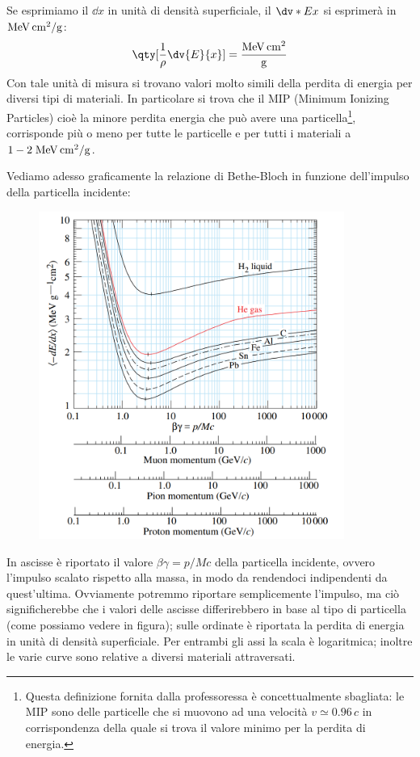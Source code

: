 Se esprimiamo il $\dd{x}$ in unità di densità superficiale, il $\dv*{E}{x}$ si esprimerà in $\rm MeV \, cm^2/g$:
\begin{equation*}
    \qty[ \frac{1}{\rho} \dv{E}{x} ]=\rm \frac{MeV \, cm^2}{g}
\end{equation*}
Con tale unità di misura si trovano valori molto simili della perdita di energia per diversi tipi di materiali. In particolare si trova che il MIP (Minimum Ionizing Particles) cioè la minore perdita energia che può avere una particella\footnote{Questa definizione fornita dalla professoressa è concettualmente sbagliata: le MIP sono delle particelle che si muovono ad una velocità $v \simeq 0.96 \, c$ in corrispondenza della quale si trova il valore minimo per la perdita di energia.}, corrisponde più o meno per tutte le particelle e per tutti i materiali a $1-2 \; \rm MeV \, cm^2/g$.

Vediamo adesso graficamente la relazione di Bethe-Bloch in funzione dell'impulso della particella incidente:
\begin{figure}[H]
    \centering
    \includegraphics[width=10cm]{immagini/grafico_bethe_bloch.png}
\end{figure}
In ascisse è riportato il valore $\beta\gamma=p/Mc$ della particella incidente, ovvero l'impulso scalato rispetto alla massa, in modo da rendendoci indipendenti da quest'ultima. Ovviamente potremmo riportare semplicemente l'impulso, ma ciò significherebbe che i valori delle ascisse differirebbero in base al tipo di particella (come possiamo vedere in figura); sulle ordinate è riportata la perdita di energia in unità di densità superficiale. Per entrambi gli assi la scala è logaritmica; inoltre le varie curve sono relative a diversi materiali attraversati.


